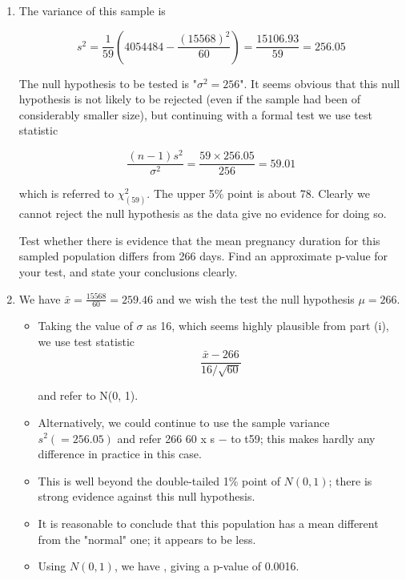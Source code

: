 \documentclass[a4paper,12pt]{article}
\begin{document}
 \begin{enumerate}
\item The variance of this sample is 

\[ s^2 = \frac{1}{59}\left( 4054484 - \frac{(15568)^2}{60} \right) = \frac{15106.93}{59} =256.05\]
 
 
The null hypothesis to be tested is "$\sigma^2= 256$".  It seems obvious that this null hypothesis is not likely to be rejected (even if the sample had been of considerably smaller size), but continuing with a formal test we use test statistic 
 
\[  \frac{(n-1)s^2}{\sigma^2} = \frac{59 \times 256.05}{256} =59.01 \]
 
 
which is referred to $\chi^2_{(59)}$.  The upper 5\% point is about 78.  Clearly we cannot reject the null hypothesis as the data give no evidence for doing so. 
\newpage

\begin{framed}
\large
Test whether there is evidence that the mean pregnancy duration for this sampled population differs from 266 days.  Find an approximate p-value for your test, and state your conclusions clearly. 
\end{framed} 

\large
\item We have  $ \displaystyle {\bar{x} = \frac{15568}{60} = 259.46 }$  and we wish the test the null hypothesis $\mu=266$.
\begin{itemize}
    \item Taking the value of $\sigma$ as 16, which seems highly plausible from part (i), we use test statistic 
\[  \frac{\bar{x} - 266}{16 / \sqrt{60} }\]
 
and refer to N(0, 1). 
   \item Alternatively, we could continue to use the sample variance $s^2 (= 256.05)$ and refer 266 60 x s − to t59;  this makes hardly any difference in practice in this case. 
 
   \item This is well beyond the double-tailed 1\% point of $N(0, 1)$;  there is strong evidence against this null hypothesis.  
   
      \item It is reasonable to conclude that this population has a mean different from the "normal" one;  it appears to be less. 
 
   \item Using $N(0, 1)$, we have , giving a p-value of 0.0016. 
\end{itemize}
\end{enumerate}
\end{document}
